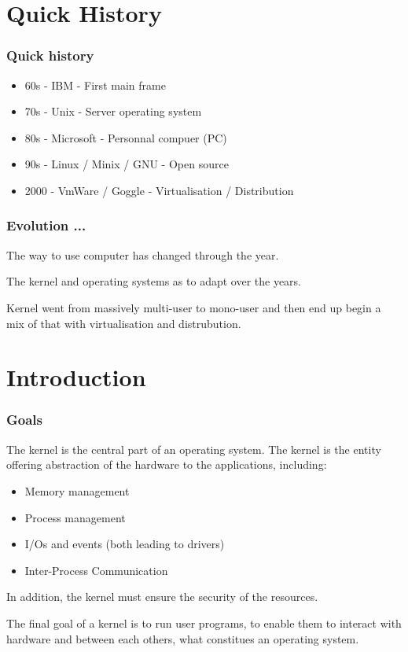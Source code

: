 %
%

\section{Quick History}

\begin{frame}
\frametitle{Quick history}

        \begin{itemize}
                \item 60s - IBM - First main frame
                \item 70s - Unix - Server operating system 
                \item 80s - Microsoft  - Personnal compuer (PC)
                \item 90s - Linux / Minix / GNU - Open source
                \item 2000 - VmWare / Goggle - Virtualisation / Distribution 
        \end{itemize}

\end{frame}

\begin{frame}
\frametitle{Evolution ...}
The way to use computer has changed through the year.

  \-

The kernel and operating systems as to adapt over the years.

  \-

Kernel went from massively multi-user to mono-user and then end up begin
a mix of that with virtualisation and distrubution.
\end{frame}

\section{Introduction}


\begin{frame}
  \frametitle{Goals}

  The kernel is the central part of an operating system. The kernel is
  the entity offering abstraction of the hardware to the applications,
  including:

  \begin{itemize}
  \item
    Memory management
  \item
    Process management
  \item
    I/Os and events (both leading to drivers)
  \item
    Inter-Process Communication
  \end{itemize}

  In addition, the kernel must ensure the security of the resources.

  \-

  The final goal of a kernel is to run user programs, to enable them
  to interact with hardware and between each others, what constitues
  an operating system.

\end{frame}

